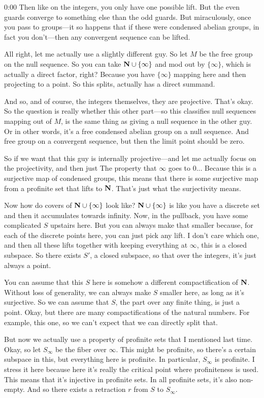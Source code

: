 \begin{unfinished}{0:00}
Then like on the integers, you only have one possible lift. But the even guards converge to something else than the odd guards. But miraculously, once you pass to groups---it so happens that if these were condensed abelian groups, in fact you don't---then any convergent sequence can be lifted.

All right, let me actually use a slightly different guy. So let $M$ be the free group on the null sequence. So you can take $\mathbf N \cup \{\infty\}$ and mod out by $\{\infty\}$, which is actually a direct factor, right? Because you have $\{\infty\}$ mapping here and then projecting to a point. So this splits, actually has a direct summand.

And so, and of course, the integers themselves, they are projective. That's okay. So the question is really whether this other part---so this classifies null sequences mapping out of $M$, is the same thing as giving a null sequence in the other guy. Or in other words, it's a free condensed abelian group on a null sequence. And free group on a convergent sequence, but then the limit point should be zero.

So if we want that this guy is internally projective---and let me actually focus on the projectivity, and then just
The property that $\infty$ goes to $0$... Because this is a surjective map of condensed groups, this means that there is some surjective map from a profinite set that lifts to $\mathbf N$. That's just what the surjectivity means.

Now how do covers of $\mathbf N \cup \{\infty\}$ look like? $\mathbf N \cup \{\infty\}$ is like you have a discrete set and then it accumulates towards infinity. Now, in the pullback, you have some complicated $S$ upstairs here. But you can always make that smaller because, for each of the discrete points here, you can just pick any lift. I don't care which one, and then all these lifts together with keeping everything at $\infty$, this is a closed subspace. So there exists $S'$, a closed subspace, so that over the integers, it's just always a point.

You can assume that this $S$ here is somehow a different compactification of $\mathbf N$. Without loss of generality, we can always make $S$ smaller here, as long as it's surjective. So we can assume that $S$, the part over any finite thing, is just a point. Okay, but there are many compactifications of the natural numbers. For example, this one, so we can't expect that we can directly split that.

But now we actually use a property of profinite sets that I mentioned last time. Okay, so let $S_\infty$ be the fiber over $\infty$. This might be profinite, so there's a certain subspace in this, but everything here is profinite. In particular, $S_\infty$ is profinite. I stress it here because here it's really the critical point where profiniteness is used. This means that it's injective in profinite sets. In all profinite sets, it's also non-empty. And so there exists a retraction $r$ from $S$ to $S_\infty$.


\end{unfinished}
